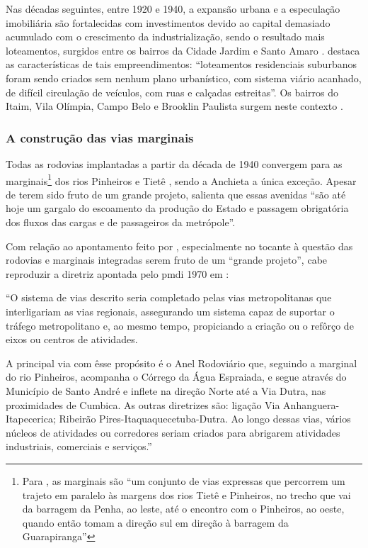 \documentclass[
article,			%
11pt,				%
oneside,			%
a4paper,			%
english,			%
brazil,				%
sumario=tradicional
]{abntex2}
\begin{document}
	Nas décadas seguintes, entre 1920 e 1940, a expansão urbana e a especulação imobiliária são fortalecidas com investimentos devido ao capital demasiado acumulado com o crescimento da industrialização, sendo o resultado mais loteamentos, surgidos entre os bairros da Cidade Jardim e Santo Amaro  .   destaca as características de tais empreendimentos: ``loteamentos residenciais suburbanos foram sendo criados sem nenhum plano urbanístico, com sistema viário acanhado, de difícil circulação de veículos, com ruas e calçadas estreitas''. Os bairros do Itaim, Vila Olímpia, Campo Belo e Brooklin Paulista surgem neste contexto .
	
	\subsubsection{A construção das vias marginais} \label{s3:construindo}
	
	Todas as rodovias implantadas a partir da década de 1940 convergem para as marginais\footnote{Para , as marginais são ``um conjunto de vias expressas que percorrem um trajeto em paralelo às margens dos rios Tietê e Pinheiros, no trecho que vai da barragem da Penha, ao leste, até o encontro com o Pinheiros, ao oeste, quando então tomam a direção sul em direção à barragem da Guarapiranga''} dos rios Pinheiros e Tietê \cite[p. 12]{franco2005a}, sendo a Anchieta a única exceção. Apesar de terem sido fruto de um grande projeto,  salienta que essas avenidas ``são até hoje um gargalo do escoamento da produção do Estado e passagem obrigatória dos fluxos das cargas e de passageiros da metrópole''.
	
	Com relação ao apontamento feito por , especialmente no tocante à questão das rodovias e marginais integradas serem fruto de um ``grande projeto'', cabe reproduzir a diretriz apontada pelo \gls{pmdi} 1970 em :
	
	\begin{citacao}
		``O sistema de vias descrito seria completado pelas vias metropolitanas que interligariam as vias regionais, assegurando um sistema capaz de suportar o tráfego metropolitano e, ao mesmo tempo, propiciando a criação ou o refôrço de eixos ou centros de atividades.
		
		A principal via com êsse propósito é o Anel Rodoviário que, seguindo a marginal do rio Pinheiros, acompanha o Córrego da Água Espraiada, e segue através do Município de Santo André e inflete na direção Norte até a Via Dutra, nas proximidades de Cumbica. As outras diretrizes são: ligação Via Anhanguera-Itapecerica; Ribeirão Pires-Itaquaquecetuba-Dutra. Ao longo dessas vias, vários núcleos de atividades ou corredores seriam criados para abrigarem atividades industriais, comerciais e serviços.''
	\end{citacao}
	
\end{document}
